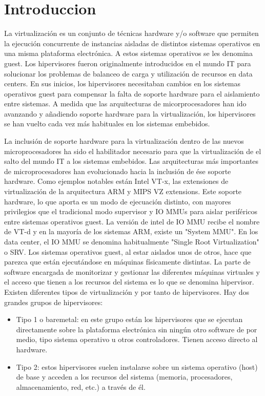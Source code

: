\section{Introduccion}
\label{ch:introduccion:primera}
La virtualización es un conjunto de técnicas hardware y/o software que permiten la ejecución
concurrente de instancias aisladas de distintos sistemas operativos en una misma plataforma
electrónica. A estos sistemas operativos se les denomina guest.
Los hipervisores fueron originalmente introducidos en el mundo IT para solucionar los problemas de
balanceo de carga y utilización de recursos en data centers. En sus inicios, los hipervisores necesitaban cambios en
los sistemas operativos guest para compensar la falta de soporte hardware para el aislamiento
entre sistemas. A medida que las arquitecturas de micorprocesadores han ido avanzando y añadiendo
soporte hardware para la virtualización, los hipervisores se han vuelto cada vez más habituales en los
sistemas embebidos.

La inclusión de soporte hardware para la virtualización dentro de las nuevos microprocesadores ha sido
el habilitador necesario para que la virtualización de el salto del mundo IT a los sistemas embebidos. Las
arquitecturas más importantes de microprocesadores han evolucionado hacia la inclusión de ése soporte hardware.
Como ejemplos notables están Intel VT-x, las extensiones de virtualización de la arquitectura ARM y MIPS VZ
extensions.
Este soporte hardware, lo que aporta es un modo de ejecuación distinto, con mayores privilegios que el tradicional modo
supervisor y IO MMUs para aislar periféricos entre sistemas operativos guest. La versión de intel de IO MMU recibe el
nombre de VT-d y en la mayoría de los sistemas ARM, existe un "System MMU". En los data center, el IO MMU se denomina habitualmente "Single Root Virtualization" o SRV.
Los sistemas operativos guest, al estar aislados unos de otros, hace que parezca que
están ejecutándose en máquinas físicamente distintas. La parte de software encargada de
monitorizar y gestionar las diferentes máquinas virtuales y el acceso que tienen a los recursos del
sistema es lo que se denomina hipervisor.
Existen diferentes tipos de virtualización y por tanto de hipervisores. Hay dos grandes grupos de
hipervisores:
\begin{itemize}
\item Tipo 1 o baremetal: en este grupo están los hipervisores que se ejecutan directamente sobre
la plataforma electrónica sin ningún otro software de por medio, tipo sistema operativo u
otros controladores. Tienen acceso directo al hardware.
\item Tipo 2: estos hipervisores suelen instalarse sobre un sistema operativo (host) de base y
acceden a los recursos del sistema (memoria, procesadores, almacenamiento, red, etc.) a
través de él.
\end{itemize}

